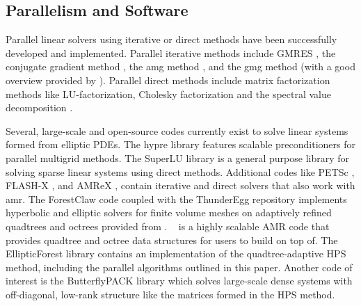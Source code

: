 \subsection{Parallelism and Software}

Parallel linear solvers using iterative or direct methods have been successfully developed and implemented. Parallel iterative methods include GMRES \citep{saad1986gmres}, the conjugate gradient method \citep{hestenes1952methods}, the \gls{amg} method \citep{yang2002boomeramg}, and the \gls{gmg} method \citep{sundar2012parallel} (with a good overview provided by \citet{chow2006survey}). Parallel direct methods include matrix factorization methods like LU-factorization, Cholesky factorization and the spectral value decomposition \citep{donfack2015survey, demmel1999asynchronous, gupta1997highly}.


Several, large-scale and open-source codes currently exist to solve linear systems formed from elliptic PDEs. The hypre library \citep{falgout2002hypre} features scalable preconditioners for parallel multigrid methods. The SuperLU library \citep{li2005superlu} is a general purpose library for solving sparse linear systems using direct methods. Additional codes like PETSc \citep{anl2023petsc}, FLASH-X \citep{dubey2022flash}, and AMReX \citep{zhang2019amrex}, contain iterative and direct solvers that also work with \gls{amr}. The ForestClaw code \citep{calhoun2017forestclaw} coupled with the ThunderEgg repository \citep{aiton2022thunderegg} implements hyperbolic and elliptic solvers for finite volume meshes on adaptively refined quadtrees and octrees provided from \pforest. \pforest\ \citep{burstedde2011p4est,burstedde2020parallel} is a highly scalable AMR code that provides quadtree and octree data structures for users to build on top of. The EllipticForest library \citep{chipman2024ellipticforest} contains an implementation of the quadtree-adaptive HPS method, including the parallel algorithms outlined in this paper. Another code of interest is the ButterflyPACK library \citep{liu2018butterflypack} which solves large-scale dense systems with off-diagonal, low-rank structure like the matrices formed in the HPS method.